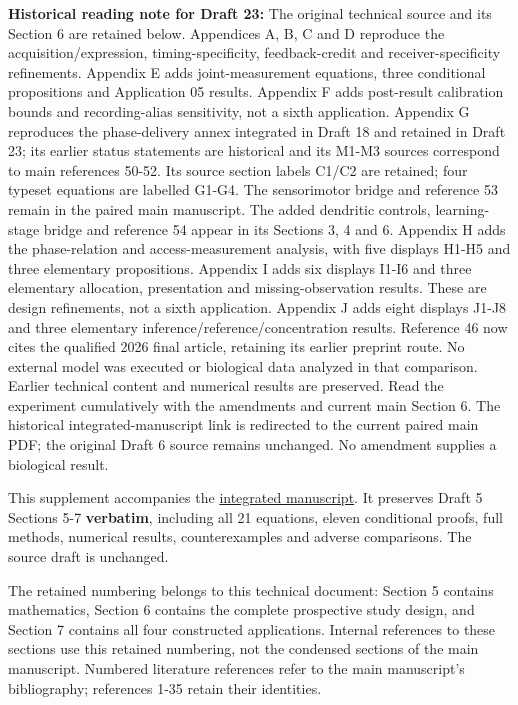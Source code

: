 \documentclass[
  american,
  11pt,
  letterpaper,
]{article}
\begin{document}
\textbf{Historical reading note for Draft 23:} The original technical source and its Section 6 are retained below. Appendices A, B, C and D reproduce the acquisition/expression, timing-specificity, feedback-credit and receiver-specificity refinements. Appendix E adds joint-measurement equations, three conditional propositions and Application 05 results. Appendix F adds post-result calibration bounds and recording-alias sensitivity, not a sixth application. Appendix G reproduces the phase-delivery annex integrated in Draft 18 and retained in Draft 23; its earlier status statements are historical and its M1-M3 sources correspond to main references 50-52. Its source section labels C1/C2 are retained; four typeset equations are labelled G1-G4. The sensorimotor bridge and reference 53 remain in the paired main manuscript. The added dendritic controls, learning-stage bridge and reference 54 appear in its Sections 3, 4 and 6. Appendix H adds the phase-relation and access-measurement analysis, with five displays H1-H5 and three elementary propositions. Appendix I adds six displays I1-I6 and three elementary allocation, presentation and missing-observation results. These are design refinements, not a sixth application. Appendix J adds eight displays J1-J8 and three elementary inference/reference/concentration results. Reference 46 now cites the qualified 2026 final article, retaining its earlier preprint route. No external model was executed or biological data analyzed in that comparison. Earlier technical content and numerical results are preserved. Read the experiment cumulatively with the amendments and current main Section 6. The historical integrated-manuscript link is redirected to the current paired main PDF; the original Draft 6 source remains unchanged. No amendment supplies a biological result.

This supplement accompanies the \href{https://raw.githubusercontent.com/v5ma/v5ma.github.io/master/papers/companions/learning-to-feel-v1.0/Learning-to-Feel-v1.0.pdf}{integrated manuscript}. It preserves Draft 5 Sections 5-7 \textbf{verbatim}, including all 21 equations, eleven conditional proofs, full methods, numerical results, counterexamples and adverse comparisons. The source draft is unchanged.

The retained numbering belongs to this technical document: Section 5 contains mathematics, Section 6 contains the complete prospective study design, and Section 7 contains all four constructed applications. Internal references to these sections use this retained numbering, not the condensed sections of the main manuscript. Numbered literature references refer to the main manuscript's bibliography; references 1-35 retain their identities.
\end{document}
